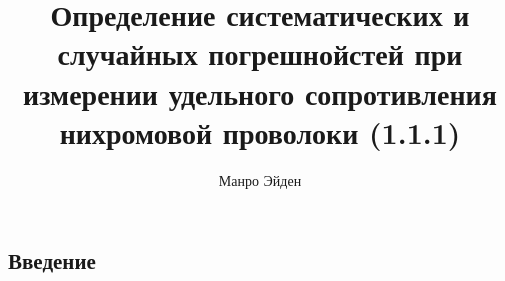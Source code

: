 \documentclass[a4paper, 12pt]{article}
\title{\textbf{Определение систематических и случайных погрешнойстей при измерении удельного сопротивления нихромовой проволоки (1.1.1)}}
\author{Манро Эйден}
\date{}
\begin{document}
	
	\maketitle

	\begin{center}
	    \section*{Введение}    
	\end{center}     
\end{document}
